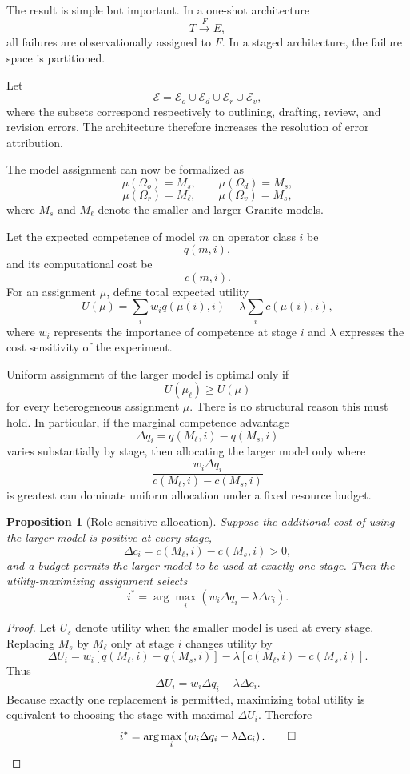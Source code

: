 \documentclass[11pt]{article}
\newtheorem{proposition}[definition]{Proposition}
\begin{document}
The result is simple but important. In a one-shot architecture
\[
    T\xrightarrow{F}E,
\]
all failures are observationally assigned to \(F\). In a staged architecture, the failure space is partitioned.

Let
\[
    \mathcal{E}
    =
    \mathcal{E}_o
    \cup
    \mathcal{E}_d
    \cup
    \mathcal{E}_r
    \cup
    \mathcal{E}_v,
\]
where the subsets correspond respectively to outlining, drafting, review, and revision errors. The architecture therefore increases the resolution of error attribution.

The model assignment can now be formalized as
\[
    \mu(\Omega_o)=M_s,
    \qquad
    \mu(\Omega_d)=M_s,
\]
\[
    \mu(\Omega_r)=M_\ell,
    \qquad
    \mu(\Omega_v)=M_s,
\]
where \(M_s\) and \(M_\ell\) denote the smaller and larger Granite models.

Let the expected competence of model \(m\) on operator class \(i\) be
\[
    q(m,i),
\]
and its computational cost be
\[
    c(m,i).
\]
For an assignment \(\mu\), define total expected utility
\[
    U(\mu)
    =
    \sum_{i}
    w_i q(\mu(i),i)
    -
    \lambda
    \sum_i c(\mu(i),i),
\]
where \(w_i\) represents the importance of competence at stage \(i\) and \(\lambda\) expresses the cost sensitivity of the experiment.

Uniform assignment of the larger model is optimal only if
\[
    U(\mu_\ell)
    \geq
    U(\mu)
\]
for every heterogeneous assignment \(\mu\). There is no structural reason this must hold. In particular, if the marginal competence advantage
\[
    \Delta q_i
    =
    q(M_\ell,i)-q(M_s,i)
\]
varies substantially by stage, then allocating the larger model only where
\[
    \frac{w_i\Delta q_i}
         {c(M_\ell,i)-c(M_s,i)}
\]
is greatest can dominate uniform allocation under a fixed resource budget.

\begin{proposition}[Role-sensitive allocation]
Suppose the additional cost of using the larger model is positive at every stage,
\[
    \Delta c_i
    =
    c(M_\ell,i)-c(M_s,i)>0,
\]
and a budget permits the larger model to be used at exactly one stage. Then the utility-maximizing assignment selects
\[
    i^\ast
    =
    \arg\max_i
    \left(
    w_i\Delta q_i-\lambda\Delta c_i
    \right).
\]
\end{proposition}

\begin{proof}
Let \(U_s\) denote utility when the smaller model is used at every stage. Replacing \(M_s\) by \(M_\ell\) only at stage \(i\) changes utility by
\[
    \Delta U_i
    =
    w_i
    \left[
        q(M_\ell,i)-q(M_s,i)
    \right]
    -
    \lambda
    \left[
        c(M_\ell,i)-c(M_s,i)
    \right].
\]
Thus
\[
    \Delta U_i
    =
    w_i\Delta q_i-\lambda\Delta c_i.
\]
Because exactly one replacement is permitted, maximizing total utility is equivalent to choosing the stage with maximal \(\Delta U_i\). Therefore
\[
    i^\ast
    =
    \arg\max_i
    \left(
    w_i\Delta q_i-\lambda\Delta c_i
    \right).
    \qed
\]
\end{proof}
\end{document}
